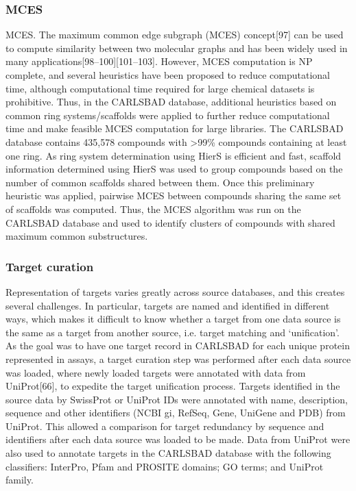 \subsubsection{MCES}

MCES. The maximum common edge subgraph (MCES) concept[97] can be used to compute similarity between two molecular graphs and has been widely used in many applications[98–100][101–103]. However, MCES computation is NP complete, and several heuristics have been proposed to reduce computational time, although computational time required for large chemical datasets is prohibitive. Thus, in the CARLSBAD database, additional heuristics based on common ring systems/scaffolds were applied to further reduce computational time and make feasible MCES computation for large libraries. The CARLSBAD database contains 435,578 compounds with >99\% compounds containing at least one ring. As ring system determination using HierS is efficient and fast, scaffold information determined using HierS was used to group compounds based on the number of common scaffolds shared between them. Once this preliminary heuristic was applied, pairwise MCES between compounds sharing the same set of scaffolds was computed. Thus, the MCES algorithm was run on the CARLSBAD database and used to identify clusters of compounds with shared maximum common substructures.

\subsubsection{Target curation}

Representation of targets varies greatly across source databases, and this creates several challenges. In particular, targets are named and identified in different ways, which makes it difficult to know whether a target from one data source is the same as a target from another source, i.e. target matching and ‘unification’. As the goal was to have one target record in CARLSBAD for each unique protein represented in assays, a target curation step was performed after each data source was loaded, where newly loaded targets were annotated with data from UniProt[66], to expedite the target unification process. Targets identified in the source data by SwissProt or UniProt IDs were annotated with name, description, sequence and other identifiers (NCBI gi, RefSeq, Gene, UniGene and PDB) from UniProt. This allowed a comparison for target redundancy by sequence and identifiers after each data source was loaded to be made. Data from UniProt were also used to annotate targets in the CARLSBAD database with the following classifiers: InterPro, Pfam and PROSITE domains; GO terms; and UniProt family.

